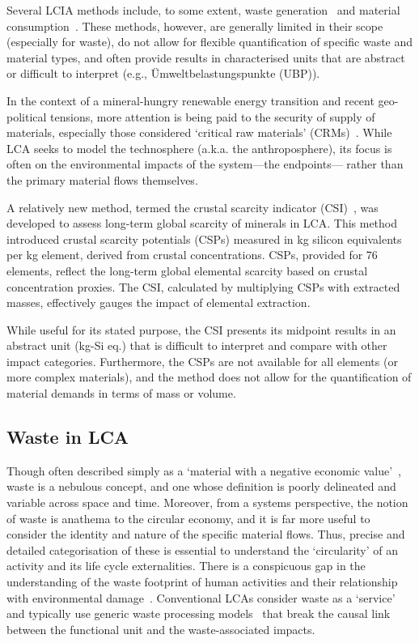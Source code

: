 Several LCIA methods include, to some extent, waste generation~\citep{foen2021ecofactors,hauschild2003edip,cen2019en15804} and material consumption~\citep{arvidsson2020csi,foen2021ecofactors}. These methods, however, are generally limited in their scope (especially for waste), do not allow for flexible quantification of specific waste and material types, and often provide results in characterised units that are abstract or difficult to interpret (e.g., Ümweltbelastungspunkte (UBP)).


In the context of a mineral-hungry renewable energy transition and recent geo-political tensions, more attention is being paid to the security of supply of materials, especially those considered `critical raw materials' (CRMs)~\citep{eu2023crmstudy,hool2023crm,mancini2013supplysecurity,jrc2023supplychain,hartley2024cepolitics,salviulo2021supplychain}. While LCA seeks to model the technosphere (a.k.a. the anthroposphere), its focus is often on the environmental impacts of the system---the endpoints--- rather than the primary material flows themselves. 

A relatively new method, termed the crustal scarcity indicator (CSI)~\citep{arvidsson2020csi}, was developed to assess long-term global scarcity of minerals in LCA. This method introduced crustal scarcity potentials (CSPs) measured in kg silicon equivalents per kg element, derived from crustal concentrations. CSPs, provided for 76 elements, reflect the long-term global elemental scarcity based on crustal concentration proxies. The CSI, calculated by multiplying CSPs with extracted masses, effectively gauges the impact of elemental extraction. 

While useful for its stated purpose, the CSI presents its midpoint results in an abstract unit (kg-Si eq.) that is difficult to interpret and compare with other impact categories. Furthermore, the CSPs are not available for all elements (or more complex materials), and the method does not allow for the quantification of material demands in terms of mass or volume.


\subsection{Waste in LCA}

Though often described simply as a `material with a negative economic value'~\citep{guinee2004economicallocation}, waste is a nebulous concept, and one whose definition is poorly delineated and variable across space and time.  Moreover, from a systems perspective, the notion of waste is anathema to the circular economy, and it is far more useful to consider the identity and nature of the specific material flows. Thus, precise and detailed categorisation of these is essential to understand the `circularity' of an activity and its life cycle externalities. There is a conspicuous gap in the understanding of the waste footprint of human activities and their relationship with environmental damage~\citep{laurenti2023wastefootprint}. Conventional LCAs consider waste as a `service'~\citep{guinee2021wasteisnotaservice} and typically use generic waste processing models~\citep{beylot2018} that break the causal link between the functional unit and the waste-associated impacts.

